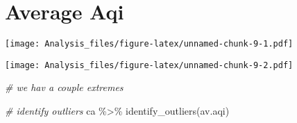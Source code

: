 \documentclass[
]{article}
\newenvironment{Shaded}{\begin{snugshade}}{\end{snugshade}}
\newcommand{\AttributeTok}[1]{\textcolor[rgb]{0.77,0.63,0.00}{#1}}
\newcommand{\CommentTok}[1]{\textcolor[rgb]{0.56,0.35,0.01}{\textit{#1}}}
\newcommand{\DecValTok}[1]{\textcolor[rgb]{0.00,0.00,0.81}{#1}}
\newcommand{\FunctionTok}[1]{\textcolor[rgb]{0.00,0.00,0.00}{#1}}
\newcommand{\NormalTok}[1]{#1}
\newcommand{\SpecialCharTok}[1]{\textcolor[rgb]{0.00,0.00,0.00}{#1}}
\begin{document}
\hypertarget{average-aqi}{%
\section{Average Aqi}\label{average-aqi}}

\begin{Shaded}
\end{Shaded}

\texttt{[image: Analysis\_files/figure-latex/unnamed-chunk-9-1.pdf]}

\begin{Shaded}
\end{Shaded}

\texttt{[image: Analysis\_files/figure-latex/unnamed-chunk-9-2.pdf]}

\begin{Shaded}
\begin{Highlighting}[]
\CommentTok{\# we hav a couple extremes}

\CommentTok{\# identify outliers}
\NormalTok{ca }\SpecialCharTok{\%\textgreater{}\%} \FunctionTok{identify\_outliers}\NormalTok{(av.aqi)}
\end{Highlighting}
\end{Shaded}
\end{document}
